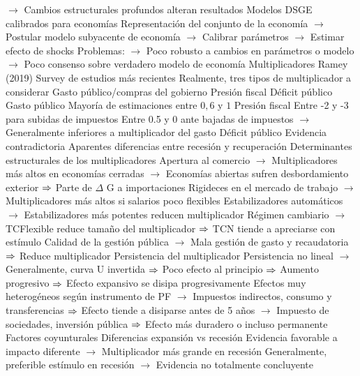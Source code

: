 \documentclass{nuevotema}
\begin{document}
\begin{esquemal}
				\4[] $\to$ Cambios estructurales profundos alteran resultados
				\4 Modelos DSGE calibrados para economías
				\4[] Representación del conjunto de la economía
				\4[] $\to$ Postular modelo subyacente de economía
				\4[] $\to$ Calibrar parámetros
				\4[] $\to$ Estimar efecto de shocks
				\4[] Problemas:
				\4[] $\to$ Poco robusto a cambios en parámetros o modelo
				\4[] $\to$ Poco consenso sobre verdadero modelo de economía
			\3 Multiplicadores
				\4 Ramey (2019)
				\4[] Survey de estudios más recientes
				\4 Realmente, tres tipos de multiplicador a considerar
				\4[] Gasto público/compras del gobierno
				\4[] Presión fiscal
				\4[] Déficit público
				\4 Gasto público
				\4[] Mayoría de estimaciones entre $0,6$ y $1$
				\4 Presión fiscal
				\4[] Entre -2 y -3 para subidas de impuestos
				\4[] Entre 0.5 y 0 ante bajadas de impuestos
				\4[] $\to$ Generalmente inferiores a multiplicador del gasto
				\4 Déficit público
				\4[] Evidencia contradictoria
				\4[] Aparentes diferencias entre recesión y recuperación
				\4 Determinantes estructurales de los multiplicadores
				\4[] Apertura al comercio
				\4[] $\to$ Multiplicadores más altos en economías cerradas
				\4[] $\to$ Economías abiertas sufren desbordamiento exterior
				\4[] $\Rightarrow$ Parte de $\Delta$ G a importaciones
				\4[] Rigideces en el mercado de trabajo
				\4[] $\to$ Multiplicadores más altos si salarios poco flexibles
				\4[] Estabilizadores automáticos
				\4[] $\to$ Estabilizadores más potentes reducen multiplicador
				\4[] Régimen cambiario
				\4[] $\to$ TCFlexible reduce tamaño del multiplicador
				\4[] $\Rightarrow$ TCN tiende a apreciarse con estímulo
				\4[] Calidad de la gestión pública
				\4[] $\to$ Mala gestión de gasto y recaudatoria
				\4[] $\Rightarrow$ Reduce multiplicador
				\4 Persistencia del multiplicador
				\4[] Persistencia no lineal
				\4[] $\to$ Generalmente, curva U invertida
				\4[] $\Rightarrow$ Poco efecto al principio
				\4[] $\Rightarrow$ Aumento progresivo
				\4[] $\Rightarrow$ Efecto expansivo se disipa progresivamente
				\4[] Efectos muy heterogéneos según instrumento de PF
				\4[] $\to$ Impuestos indirectos, consumo y transferencias
				\4[] $\Rightarrow$ Efecto tiende a disiparse antes de 5 años
				\4[] $\to$ Impuesto de sociedades, inversión pública
				\4[] $\Rightarrow$ Efecto más duradero o incluso permanente
			\3 Factores coyunturales
				\4 Diferencias expansión vs recesión
				\4[] Evidencia favorable a impacto diferente
				\4[] $\to$ Multiplicador más grande en recesión
				\4[] Generalmente, preferible estímulo en recesión
				\4[] $\to$ Evidencia no totalmente concluyente

\end{esquemal}
\end{document}
